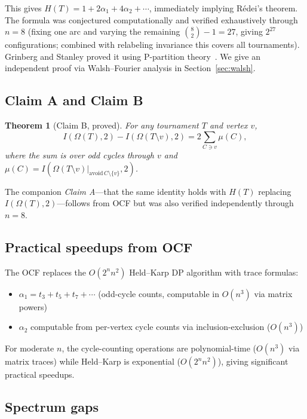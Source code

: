 \documentclass[12pt,reqno]{amsart}
\theoremstyle{plain}
\newtheorem{theorem}{Theorem}[section]
\theoremstyle{definition}
\theoremstyle{remark}
\begin{document}
This gives $H(T) = 1 + 2\alpha_1 + 4\alpha_2 + \cdots$, immediately implying
R\'edei's theorem. The formula was conjectured computationally and verified
exhaustively through $n = 8$ (fixing one arc and varying the remaining $\binom{8}{2}-1 = 27$, giving $2^{27}$ configurations; combined with relabeling invariance this covers all tournaments). Grinberg and Stanley
proved it using P-partition theory~\cite{GrinbergStanley2024}. We give an
independent proof via Walsh--Fourier analysis in Section~\ref{sec:walsh}.

\subsection{Claim A and Claim B}

\begin{theorem}[Claim B, proved]\label{thm:claimB}
For any tournament $T$ and vertex $v$,
\[
I(\Omega(T), 2) - I(\Omega(T \setminus v), 2) = 2 \sum_{C \ni v} \mu(C),
\]
where the sum is over odd cycles through $v$ and $\mu(C) = I(\Omega(T \setminus v)|_{\mathrm{avoid}\, C \setminus \{v\}}, 2)$.
\end{theorem}

The companion \emph{Claim A}---that the same identity holds with $H(T)$
replacing $I(\Omega(T), 2)$---follows from OCF but was also verified
independently through $n = 8$.

\subsection{Practical speedups from OCF}

The OCF replaces the $O(2^n n^2)$ Held--Karp DP algorithm with trace formulas:
\begin{itemize}
\item $\alpha_1 = t_3 + t_5 + t_7 + \cdots$ (odd-cycle counts, computable in $O(n^3)$
via matrix powers)
\item $\alpha_2$ computable from per-vertex cycle counts via inclusion-exclusion ($O(n^3)$)
\end{itemize}

For moderate $n$, the cycle-counting operations are polynomial-time ($O(n^3)$ via matrix traces) while Held--Karp is exponential ($O(2^n n^2)$), giving significant practical speedups.

\subsection{Spectrum gaps}
\end{document}
